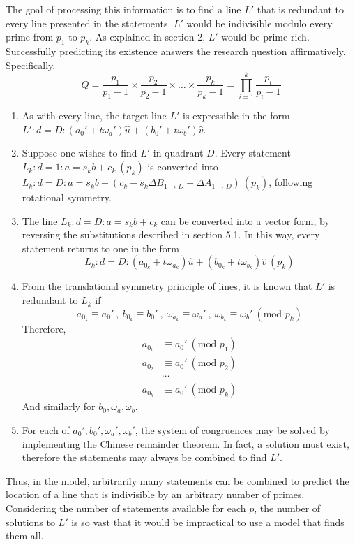 \documentclass{article}
\begin{document}
The goal of processing this information is to find a line \(L'\) that is redundant to every line presented in the statements. \(L'\) would be indivisible modulo every prime from \(p_1\) to \(p_k\). As explained in section 2, \(L'\) would be prime-rich. Successfully predicting its existence answers the research question affirmatively. Specifically,
	\[Q=\frac{p_1}{p_1-1}\times\frac{p_2}{p_2-1}\times\ldots\times\frac{p_k}{p_k-1}=\prod_{i=1}^k\frac{p_i}{p_i-1}\]
	
\begin{enumerate}
	\item As with every line, the target line \(L'\) is expressible in the form \(L':d=D:(a_0'+t\omega_a')\hat{u}+(b_0'+t\omega_b')\hat{v}\).
	\item Suppose one wishes to find \(L'\) in quadrant \(D\). Every statement \(L_k:d=1:a=s_kb+c_k\ (p_k)\) is converted into \(L_k:d=D:a=s_kb+(c_k-s_k\Delta B_{1 \rightarrow D}+\Delta A_{1 \rightarrow D})\ (p_k)\), following rotational symmetry.
	\item The line \(L_k:d=D:a=s_kb+c_k\) can be converted into a vector form, by reversing the substitutions described in section 5.1. In this way, every statement returns to one in the form
		\[L_k:d=D:(a_{0_k}+t\omega_{a_k})\hat{u}+(b_{0_k}+t\omega_{b_k})\hat{v}\ (p_k)\]
	\item From the translational symmetry principle of lines, it is known that \(L'\) is redundant to \(L_k\) if
		\[a_{0_k} \equiv a_0'\ ,\ b_{0_k} \equiv b_0'\ ,\ \omega_{a_k} \equiv \omega_a'\ ,\ \omega_{b_k} \equiv \omega_b'\ (\text{mod }p_k)\]
	Therefore,
	\begin{align}
		\nonumber a_{0_1} &\equiv a_0'\ (\text{mod }p_1) \\
		\nonumber a_{0_2} &\equiv a_0'\ (\text{mod }p_2) \\
		\nonumber &\cdots \\
		\nonumber a_{0_k} &\equiv a_0'\ (\text{mod }p_k)
	\end{align}
	And similarly for \(b_0,\omega_a,\omega_b\).
	\item For each of \(a_0',b_0',\omega_a',\omega_b'\), the system of congruences may be solved by implementing the Chinese remainder theorem. In fact, a solution must exist, therefore the statements may always be combined to find \(L'\).
\end{enumerate}

Thus, in the model, arbitrarily many statements can be combined to predict the location of a line that is indivisible by an arbitrary number of primes. Considering the number of statements available for each \(p\), the number of solutions to \(L'\) is so vast that it would be impractical to use a model that finds them all.
\end{document}
